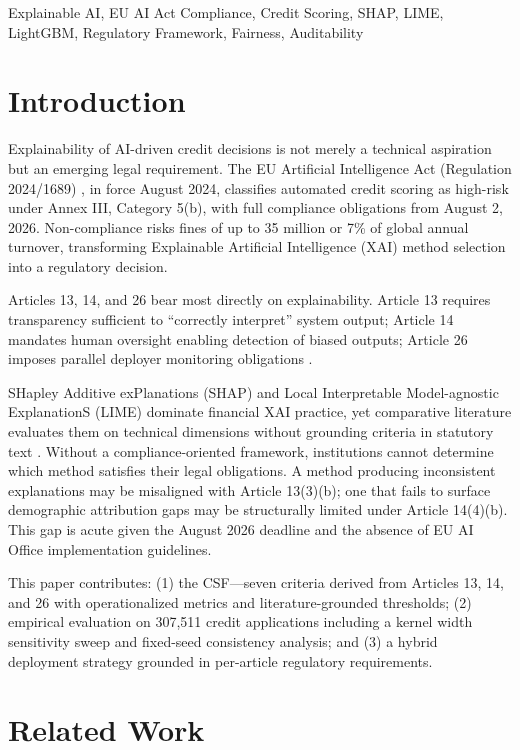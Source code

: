 \documentclass[conference]{IEEEtran}
\begin{document}
\begin{IEEEkeywords}
Explainable AI, EU AI Act Compliance, Credit Scoring, SHAP, LIME, LightGBM, Regulatory Framework, Fairness, Auditability
\end{IEEEkeywords}

\section{Introduction}

Explainability of AI-driven credit decisions is not merely
a technical aspiration but an emerging legal requirement. The
EU Artificial Intelligence Act (Regulation 2024/1689) \cite{b2}, in
force August 2024, classifies automated credit scoring as high-risk
under Annex III, Category 5(b), with full compliance obligations
from August 2, 2026. Non-compliance risks fines of up to
\texteuro{}35 million or 7\% of global annual turnover, transforming Explainable Artificial Intelligence
(XAI) method selection into a regulatory decision.

Articles 13, 14, and 26 bear most directly on explainability. Article 13 requires transparency sufficient to ``correctly interpret'' system output; Article 14 mandates human oversight enabling detection of biased outputs; Article 26 imposes parallel deployer monitoring obligations \cite{b2,b3}.

SHapley Additive exPlanations (SHAP) \cite{b4} and Local Interpretable Model-agnostic ExplanationS (LIME) \cite{b5} dominate financial XAI practice, yet comparative literature evaluates them on technical dimensions without grounding criteria in statutory text \cite{b8,b9}. Without a compliance-oriented framework, institutions cannot determine which method satisfies their legal obligations. A method producing inconsistent explanations may be misaligned with Article 13(3)(b); one that fails to surface demographic attribution gaps may be structurally limited under Article 14(4)(b). This gap is acute given the August 2026 deadline and the absence of EU AI Office implementation guidelines.

This paper contributes: (1) the CSF---seven criteria derived from Articles 13, 14, and 26 with operationalized metrics and literature-grounded thresholds; (2) empirical evaluation on 307,511 credit applications including a kernel width sensitivity sweep and fixed-seed consistency analysis; and (3) a hybrid deployment strategy grounded in per-article regulatory requirements.

\section{Related Work}
\end{document}
